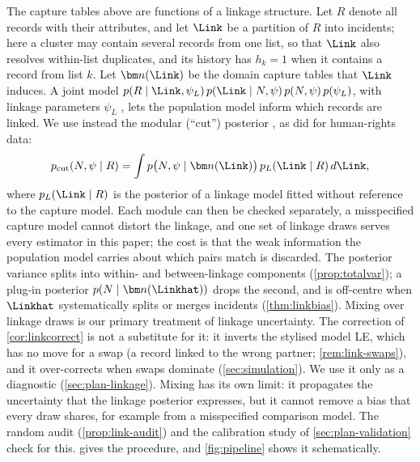 The capture tables above are functions of a linkage structure. Let $R$ denote all records with their attributes, and let $\Link$ be a partition of $R$ into incidents; here a cluster may contain several records from one list, so that $\Link$ also resolves within-list duplicates, and its history has $h_k=1$ when it contains a record from list $k$. Let $\bm n(\Link)$ be the domain capture tables that $\Link$ induces. A joint model $p(R\mid\Link,\psi_L)\,p(\Link\mid N,\psi)\,p(N,\psi)\,p(\psi_L)$, with linkage parameters $\psi_L$ \citep{tancredi2011,tancredi2020}, lets the population model inform which records are linked. We use instead the modular (``cut'') posterior \citep{bayarri2009,plummer2015}, as \citet{sadinle2018} did for human-rights data:
\begin{equation}\label{eq:models-cut}
  p_{\mathrm{cut}}(N,\psi\mid R)=\int p\big(N,\psi\mid\bm n(\Link)\big)\,p_L(\Link\mid R)\,d\Link,
\end{equation}
where $p_L(\Link\mid R)$ is the posterior of a linkage model fitted without reference to the capture model. Each module can then be checked separately, a misspecified capture model cannot distort the linkage, and one set of linkage draws serves every estimator in this paper; the cost is that the weak information the population model carries about which pairs match is discarded. The posterior variance splits into within- and between-linkage components (\cref{prop:totalvar}); a plug-in posterior $p(N\mid\bm n(\Linkhat))$ drops the second, and is off-centre when $\Linkhat$ systematically splits or merges incidents (\cref{thm:linkbias}). Mixing over linkage draws is our primary treatment of linkage uncertainty. The correction of \cref{cor:linkcorrect} is not a substitute for it: it inverts the stylised model LE, which has no move for a swap (a record linked to the wrong partner; \cref{rem:link-swaps}), and it over-corrects when swaps dominate (\cref{sec:simulation}). We use it only as a diagnostic (\cref{sec:plan-linkage}). Mixing has its own limit: it propagates the uncertainty that the linkage posterior expresses, but it cannot remove a bias that every draw shares, for example from a misspecified comparison model. The random audit (\cref{prop:link-audit}) and the calibration study of \cref{sec:plan-validation} check for this.  gives the procedure, and \cref{fig:pipeline} shows it schematically.

